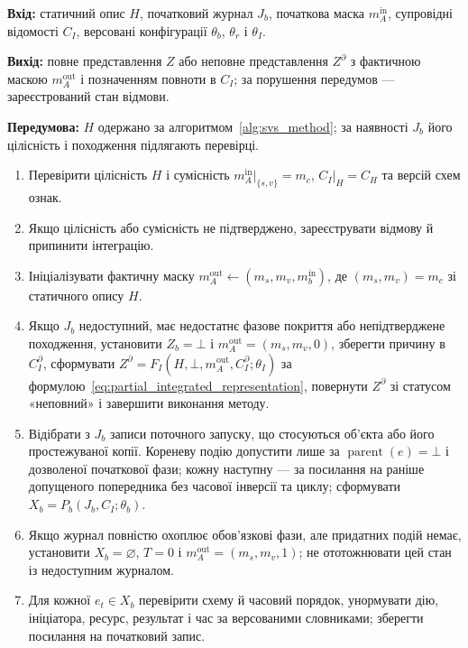 \begin{algorithm}[H]
\begingroup
\setlength{\abovecaptionskip}{0pt}
\setlength{\belowcaptionskip}{2pt}
\caption{Метод поведінкового узгодження статичного опису з подіями оброблення}
\label{alg:behavior_alignment}
\fontsize{12}{13}\selectfont
{}
\textbf{Вхід:} статичний опис $H$, початковий журнал $J_b$, початкова маска $m_A^{\mathrm{in}}$, супровідні відомості $C_I$, версовані конфігурації $\theta_b$, $\theta_r$ і $\theta_I$.\par
\textbf{Вихід:} повне представлення $Z$ або неповне представлення $Z^{\partial}$ з фактичною маскою $m_A^{\mathrm{out}}$ і позначенням повноти в $C_I$; за порушення передумов --- зареєстрований стан відмови.\par
\textbf{Передумова:} $H$ одержано за алгоритмом~\ref{alg:svs_method}; за наявності $J_b$ його цілісність і походження підлягають перевірці.\smallskip
\begin{enumerate}[label=\arabic*.,leftmargin=6mm,itemsep=0pt,topsep=1pt]
\item Перевірити цілісність $H$ і сумісність $m_A^{\mathrm{in}}|_{\{s,v\}}=m_c$, $C_I|_H=C_H$ та версій схем ознак.
\item Якщо цілісність або сумісність не підтверджено, зареєструвати відмову й припинити інтеграцію.
\item Ініціалізувати фактичну маску $m_A^{\mathrm{out}}\leftarrow(m_s,m_v,m_b^{\mathrm{in}})$, де $(m_s,m_v)=m_c$ зі статичного опису $H$.
\item Якщо $J_b$ недоступний, має недостатнє фазове покриття або непідтверджене походження, установити $Z_b=\bot$ і $m_A^{\mathrm{out}}=(m_s,m_v,0)$, зберегти причину в $C_I^{\partial}$, сформувати $Z^{\partial}=F_I(H,\bot,m_A^{\mathrm{out}},C_I^{\partial};\theta_I)$ за формулою~\eqref{eq:partial_integrated_representation}, повернути $Z^{\partial}$ зі статусом «неповний» і завершити виконання методу.
\item Відібрати з $J_b$ записи поточного запуску, що стосуються об’єкта або його простежуваної копії. Кореневу подію допустити лише за $\operatorname{parent}(e)=\bot$ і дозволеної початкової фази; кожну наступну --- за посилання на раніше допущеного попередника без часової інверсії та циклу; сформувати $X_b=P_b(J_b,C_I;\theta_b)$.
\item Якщо журнал повністю охоплює обов’язкові фази, але придатних подій немає, установити $X_b=\varnothing$, $T=0$ і $m_A^{\mathrm{out}}=(m_s,m_v,1)$; не ототожнювати цей стан із недоступним журналом.
\item Для кожної $e_t\in X_b$ перевірити схему й часовий порядок, унормувати дію, ініціатора, ресурс, результат і час за версованими словниками; зберегти посилання на початковий запис.

\end{enumerate}
\end{algorithm}

